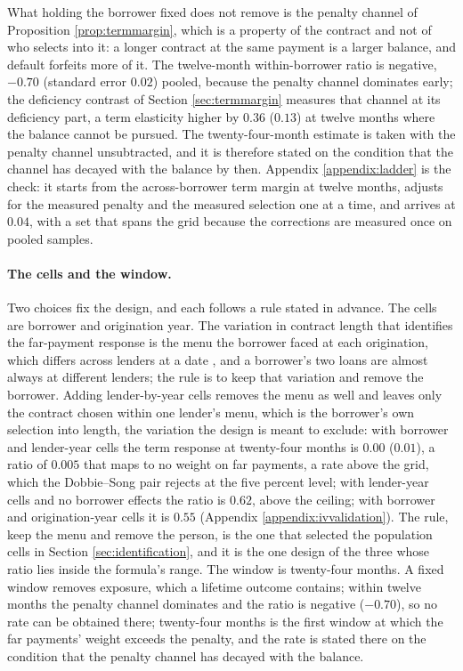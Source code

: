 What holding the borrower fixed does not remove is the penalty channel of Proposition \ref{prop:termmargin}, which is a property of the contract and not of who selects into it: a longer contract at the same payment is a larger balance, and default forfeits more of it. The twelve-month within-borrower ratio is negative, $-0.70$ (standard error $0.02$) pooled, because the penalty channel dominates early; the deficiency contrast of Section \ref{sec:termmargin} measures that channel at its deficiency part, a term elasticity higher by $0.36$ ($0.13$) at twelve months where the balance cannot be pursued. The twenty-four-month estimate is taken with the penalty channel unsubtracted, and it is therefore stated on the condition that the channel has decayed with the balance by then. Appendix \ref{appendix:ladder} is the check: it starts from the across-borrower term margin at twelve months, adjusts for the measured penalty and the measured selection one at a time, and arrives at $0.04$, with a set that spans the grid because the corrections are measured once on pooled samples.

\paragraph{The cells and the window.} Two choices fix the design, and each follows a rule stated in advance. The cells are borrower and origination year. The variation in contract length that identifies the far-payment response is the menu the borrower faced at each origination, which differs across lenders at a date \citep{hertzberg_screening_2018, argyle_monthly_2020}, and a borrower's two loans are almost always at different lenders; the rule is to keep that variation and remove the borrower. Adding lender-by-year cells removes the menu as well and leaves only the contract chosen within one lender's menu, which is the borrower's own selection into length, the variation the design is meant to exclude: with borrower and lender-year cells the term response at twenty-four months is $0.00$ ($0.01$), a ratio of $0.005$ that maps to no weight on far payments, a rate above the grid, which the Dobbie--Song pair rejects at the five percent level; with lender-year cells and no borrower effects the ratio is $0.62$, above the ceiling; with borrower and origination-year cells it is $0.55$ (Appendix \ref{appendix:ivvalidation}). The rule, keep the menu and remove the person, is the one that selected the population cells in Section \ref{sec:identification}, and it is the one design of the three whose ratio lies inside the formula's range. The window is twenty-four months. A fixed window removes exposure, which a lifetime outcome contains; within twelve months the penalty channel dominates and the ratio is negative ($-0.70$), so no rate can be obtained there; twenty-four months is the first window at which the far payments' weight exceeds the penalty, and the rate is stated there on the condition that the penalty channel has decayed with the balance.

